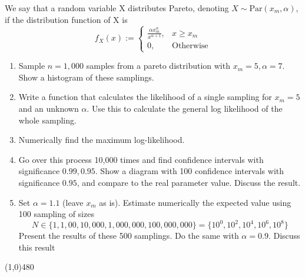 \documentclass[../main.tex]{subfiles}
\begin{document}
We say that a random variable X distributes Pareto, denoting $X\sim \text{Par}(x_m,\alpha)$, if the distribution function of X is 
\[f_X(x):= \begin{cases} \frac{\alpha x_m^{\alpha}}{x^{\alpha+1}}, & x\geq x_m \\ 0, & \text{Otherwise} \end{cases}\]
\begin{enumerate}
    
    \item Sample $n=1,000$ samples from a pareto distribution with $x_m=5,\alpha=7$. Show a histogram of these samplings. 
    
    \item Write a function that calculates the likelihood of a single sampling for $x_m=5$ and an unknown $\alpha$. Use this to calculate the general log likelihood of the whole sampling.
    
    \item Numerically find the maximum log-likelihood.
    
    \item Go over this process 10,000 times and find confidence intervals with significance $0.99,0.95$. Show a diagram with 100 confidence intervals with significance $0.95$, and compare to the real parameter value. Discuss the result. 
    
    \item Set $\alpha=1.1$ (leave $x_m$ as is). Estimate numerically the expected value using 100 sampling of sizes 
    \[N\in\{1, 1,00, 10,000, 1,000,000, 100,000,000\} = \{10^0, 10^2, 10^4, 10^6, 10^8\}\]
    Present the results of these 500 samplings. Do the same with $\alpha = 0.9$. Discuss this result
\end{enumerate}

\noindent\line(1,0){480}
\end{document}
